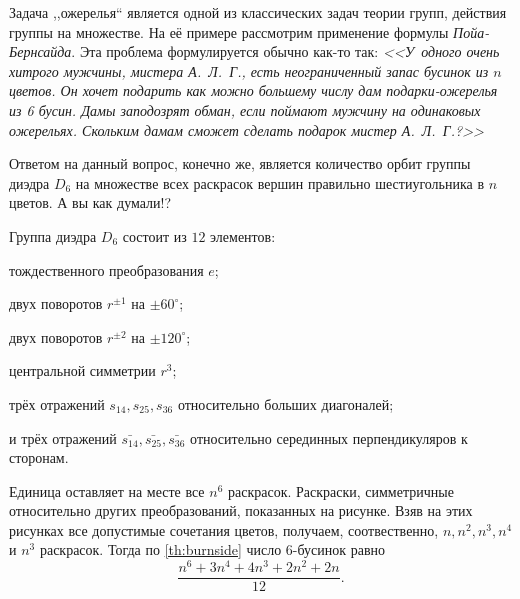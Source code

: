 \begin{example}[Ожерелья]
    Задача ,,ожерелья`` является одной из классических задач теории групп, действия группы на множестве. На её примере рассмотрим применение формулы \emph{Пойа-Бернсайда}. Эта проблема формулируется обычно как-то так: \emph{<<У~одного очень хитрого мужчины, мистера А.~Л.~Г., есть неограниченный запас бусинок из $n$ цветов. Он хочет подарить как можно большему числу дам подарки-ожерелья из 6 бусин. Дамы заподозрят обман, если поймают мужчину на одинаковых ожерельях. Скольким дамам сможет сделать подарок мистер А.~Л.~Г.?>>}

    Ответом на данный вопрос, конечно же, является количество орбит группы диэдра $D_6$ на множестве всех раскрасок вершин правильно шестиугольника в $n$ цветов. А вы как думали!?

    Группа диэдра $D_6$ состоит из $12$ элементов: \begin{bullets}
        \item тождественного преобразования $e$; 
        \item двух поворотов $r^{\pm 1}$ на $\pm 60^\circ$;
        \item двух поворотов $r^{\pm 2}$ на $\pm 120^\circ$;
        \item центральной симметрии $r^3$;
        \item трёх отражений $s_{14}, s_{25}, s_{36}$ относительно больших диагоналей;
        \item и трёх отражений $\bar{s_{14}}, \bar{s_{25}}, \bar{s_{36}}$ относительно серединных перпендикуляров к сторонам.
    \end{bullets}
    Единица оставляет на месте все $n^6$ раскрасок. Раскраски, симметричные относительно других преобразований, показанных на  рисунке.
    Взяв на этих рисунках все допустимые сочетания цветов, получаем, соотвественно, $n, n^2, n^3, n^4$ и $n^3$ раскрасок. Тогда по \cref{th:burnside} число 6-бусинок равно \[\frac{n^6 + 3n^4 +4n^3+2n^2+2n}{12}.\]

\end{example}
